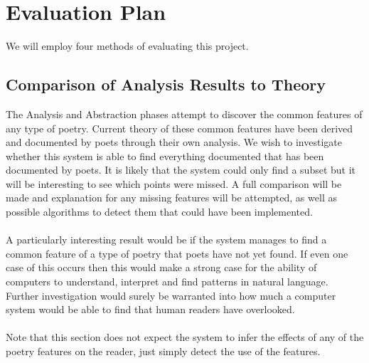 \chapter{Evaluation Plan}
\ifpdf
    \graphicspath{{Evaluation/EvaluationFigs/PNG/}{Evaluation/EvaluationFigs/PDF/}{Evaluation/EvaluationFigs/}}
\else
    \graphicspath{{Evaluation/EvaluationFigs/EPS/}{Evaluation/EvaluationFigs/}}
\fi

We will employ four methods of evaluating this project.

\section{Comparison of Analysis  Results to Theory}
The Analysis and Abstraction phases attempt to discover the common features of any type of poetry. Current theory of these common features have been derived and documented by poets through their own analysis. We wish to investigate whether this system is able to find everything documented that has been documented by poets. It is likely that the system could only find a subset but it will be interesting to see which points were missed. A full comparison will be made and explanation for any missing features will be attempted, as well as possible algorithms to detect them that could have been implemented. 
\\\\
A particularly interesting result would be if the system manages to find a common feature of a type of poetry that poets have not yet found. If even one case of this occurs then this would make a strong case for the ability of computers to understand, interpret and find patterns in natural language. Further investigation would surely be warranted into how much a computer system would be able to find that human readers have overlooked.
\\\\
Note that this section does not expect the system to infer the effects of any of the poetry features on the reader, just simply detect the use of the features.

